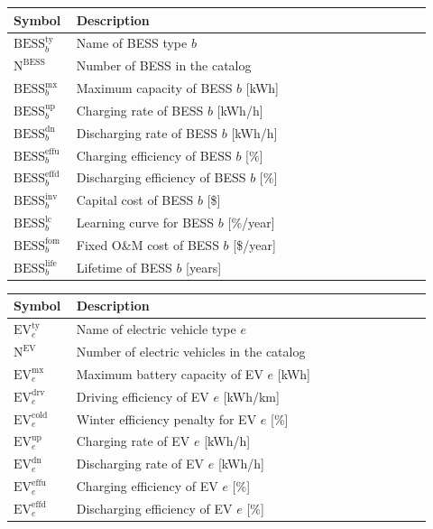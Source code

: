 \documentclass[11pt]{article}
\begin{document}
\begin{center}
\centering
\begin{tabular}{p{0.12\linewidth}p{0.8\linewidth}}
\hline
\textbf{Symbol} & \textbf{Description} \\
\hline
\(\text{BESS}^\text{ty}_b\) & Name of BESS type \(b\) \\
\(\text{N}^\text{BESS}\) & Number of BESS in the catalog \\
\(\text{BESS}^\text{mx}_b\) & Maximum capacity of BESS \(b\) [kWh] \\
\(\text{BESS}^\text{up}_b\) & Charging rate of BESS \(b\) [kWh/h] \\
\(\text{BESS}^\text{dn}_b\) & Discharging rate of BESS \(b\) [kWh/h] \\
\(\text{BESS}^\text{effu}_b\) & Charging efficiency of BESS \(b\) [\%] \\
\(\text{BESS}^\text{effd}_b\) & Discharging efficiency of BESS \(b\) [\%] \\
\(\text{BESS}^\text{inv}_b\) & Capital cost of BESS \(b\) [\$] \\
\(\text{BESS}^\text{lc}_b\) & Learning curve for BESS \(b\) [\%/year] \\
\(\text{BESS}^\text{fom}_b\) & Fixed O\&M cost of BESS \(b\) [\$/year] \\
\(\text{BESS}^\text{life}_b\) & Lifetime of BESS \(b\) [years] \\
\hline
\end{tabular}
\captionsetup{type=table}
\label{tab:bess_parameters}
\end{center}

\begin{center}
\centering
\begin{tabular}{p{0.12\linewidth}p{0.8\linewidth}}
\hline
\textbf{Symbol} & \textbf{Description} \\
\hline
\(\text{EV}^\text{ty}_e\) & Name of electric vehicle type \(e\) \\
\(\text{N}^\text{EV}\) & Number of electric vehicles in the catalog \\
\(\text{EV}^\text{mx}_e\) & Maximum battery capacity of EV \(e\) [kWh] \\
\(\text{EV}^\text{drv}_e\) & Driving efficiency of EV \(e\) [kWh/km] \\
\(\text{EV}^\text{cold}_e\) & Winter efficiency penalty for EV \(e\) [\%] \\
\(\text{EV}^\text{up}_e\) & Charging rate of EV \(e\) [kWh/h] \\
\(\text{EV}^\text{dn}_e\) & Discharging rate of EV \(e\) [kWh/h] \\
\(\text{EV}^\text{effu}_e\) & Charging efficiency of EV \(e\) [\%] \\
\(\text{EV}^\text{effd}_e\) & Discharging efficiency of EV \(e\) [\%] \\
\hline
\end{tabular}
\captionsetup{type=table}
\label{tab:ev_parameters}
\end{center}
\end{document}
